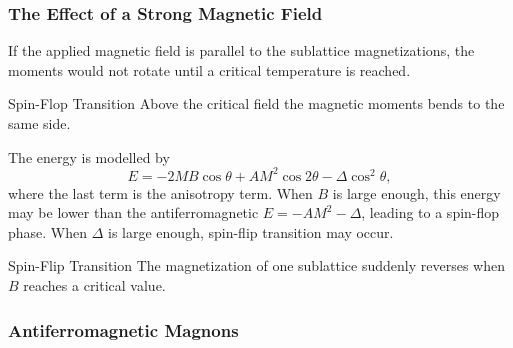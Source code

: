 \documentclass[hidelinks]{article}
\begin{document}

\subsubsection{The Effect of a Strong Magnetic Field} %
\label{ssub:the_effect_of_a_strong_magnetic_field}

If the applied magnetic field is parallel to the sublattice magnetizations, the moments would not rotate until a critical temperature is reached.
\begin{termdef}{Spin-Flop Transition}
    Above the critical field the magnetic moments bends to the same side.
\end{termdef}
\begin{marginfigure}[-4\baselineskip]%
\captionsetup{justification=raggedright, width=1.5in}
    \caption{Spin-flop transition.}%
\end{marginfigure}%
The energy is modelled by
\[ E = -2MB \cos\theta + AM^2 \cos 2\theta - \Delta \cos^2\theta, \]
where the last term is the anisotropy term. When $B$ is large enough, this energy may be lower than the antiferromagnetic $E = -AM^2 - \Delta$, leading to a spin-flop phase. When $\Delta$ is large enough, spin-flip transition may occur.
\begin{termdef}[\baselineskip]{Spin-Flip Transition}
    The magnetization of one sublattice suddenly reverses when $B$ reaches a critical value.
\end{termdef}


\subsubsection{Antiferromagnetic Magnons} %
\label{ssub:antiferromagnetic_magnons}
\end{document}
